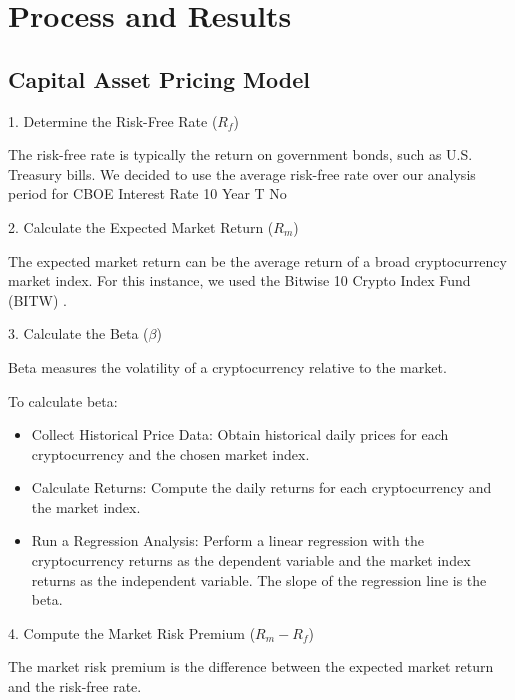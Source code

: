 \section{Process and Results}

\subsection{Capital Asset Pricing Model}

1. Determine the Risk-Free Rate (\(R_f\))

The risk-free rate is typically the return on government bonds, such as U.S. Treasury bills. We decided to use the average risk-free rate over our analysis period for CBOE Interest Rate 10 Year T No \cite{YahooFinanceTNX}

2. Calculate the Expected Market Return (\(R_m\))

The expected market return can be the average return of a broad cryptocurrency market index. For this instance, we used the Bitwise 10 Crypto Index Fund (BITW) \cite{bitw}.

3. Calculate the Beta (\(\beta\))

Beta measures the volatility of a cryptocurrency relative to the market. 

To calculate beta:

\begin{itemize}
    \item Collect Historical Price Data: Obtain historical daily prices for each cryptocurrency and the chosen market index.
    \item Calculate Returns: Compute the daily returns for each cryptocurrency and the market index.
    \item Run a Regression Analysis: Perform a linear regression with the cryptocurrency returns as the dependent variable and the market index returns as the independent variable. The slope of the regression line is the beta.
\end{itemize}

4. Compute the Market Risk Premium (\(R_m - R_f\))

The market risk premium is the difference between the expected market return and the risk-free rate.

